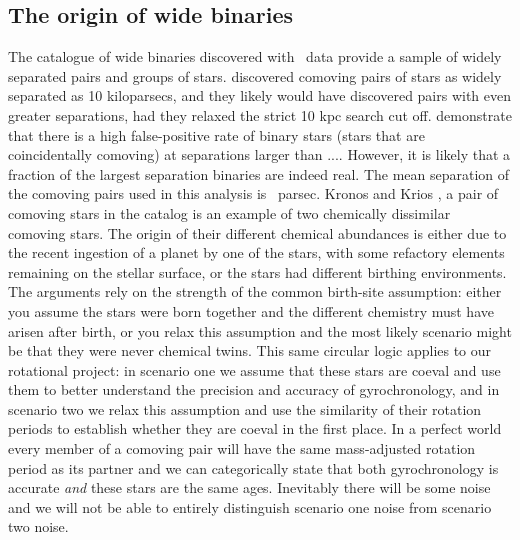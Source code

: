 \subsection{The origin of wide binaries}
The \citet{oh2016} catalogue of wide binaries discovered with \gaia\ data
provide a sample of widely separated pairs and groups of stars.
\citet{oh2016} discovered comoving pairs of stars as widely separated as 10
kiloparsecs, and they likely would have discovered pairs with even greater
separations, had they relaxed the strict 10 kpc search cut off.
\citet{andrew2017} demonstrate that there is a high false-positive rate of
binary stars (stars that are coincidentally comoving) at separations larger
than ....
However, it is likely that a fraction of the largest separation binaries are
indeed real.
The mean separation of the comoving pairs used in this analysis is \meansep\
parsec.
Kronos and Krios \citep{oh2017}, a pair of comoving stars in the
\citep{oh2016} catalog is an example of two chemically dissimilar comoving
stars.
The origin of their different chemical abundances is either due to the recent
ingestion of a planet by one of the stars, with some refactory elements
remaining on the stellar surface, or the stars had different birthing
environments.
The arguments rely on the strength of the common birth-site assumption: either
you assume the stars were born together and the different chemistry must
have arisen after birth, or you relax this assumption and the most likely
scenario might be that they were never chemical twins.
This same circular logic applies to our rotational project: in scenario one we
assume that these stars are coeval and use them to better understand the
precision and accuracy of gyrochronology, and in scenario two we relax this
assumption and use the similarity of their rotation periods to establish
whether they are coeval in the first place.
In a perfect world every member of a comoving pair will have the same
mass-adjusted rotation period as its partner and we can categorically state
that both gyrochronology is accurate {\it and} these stars are the same ages.
Inevitably there will be some noise and we will not be able to entirely
distinguish scenario one noise from scenario two noise.
